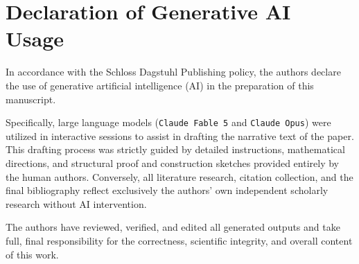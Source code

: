 \documentclass[a4paper,UKenglish,autoref,anonymous]{lipics-v2021}
\begin{document}
\section*{Declaration of Generative AI Usage}
\label{sec:ai-disclosure}

In accordance with the Schloss Dagstuhl Publishing policy, the authors declare the use of generative artificial intelligence (AI) in the preparation of this manuscript.

Specifically, large language models (\texttt{Claude Fable 5} and \texttt{Claude Opus}) were utilized in interactive sessions to assist in drafting the narrative text of the paper. This drafting process was strictly guided by detailed instructions, mathematical directions, and structural proof and construction sketches provided entirely by the human authors. Conversely, all literature research, citation collection, and the final bibliography reflect exclusively the authors' own independent scholarly research without AI intervention.

The authors have reviewed, verified, and edited all generated outputs and take full, final responsibility for the correctness, scientific integrity, and overall content of this work.



\end{document}
